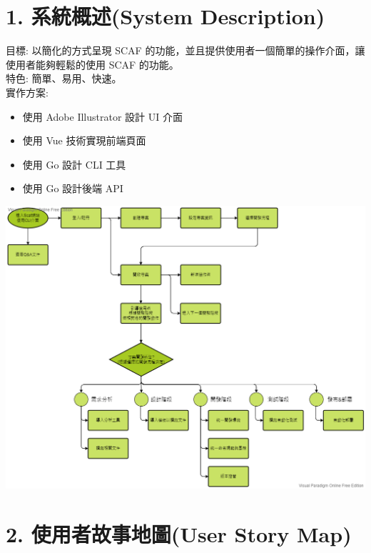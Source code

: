 \documentclass{report}
\begin{document}
\section*{1. 系統概述(System Description)}
目標: 以簡化的方式呈現 SCAF 的功能，並且提供使用者一個簡單的操作介面，讓使用者能夠輕鬆的使用 SCAF 的功能。\\
特色: 簡單、易用、快速。\\
實作方案:
  \begin{itemize}
    \item 使用 Adobe Illustrator 設計 UI 介面
    \item 使用 Vue 技術實現前端頁面
    \item 使用 Go 設計 CLI 工具
    \item 使用 Go 設計後端 API
  \end{itemize}
\includegraphics[width=\textwidth]{assets/system.png}

\section*{2. 使用者故事地圖(User Story Map)}

\end{document}
